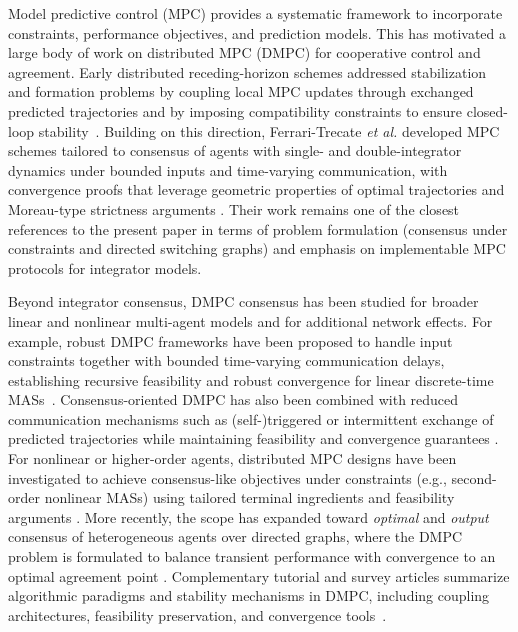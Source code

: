\documentclass[12pt,draftcls,onecolumn]{IEEEtran}
\begin{document}
Model predictive control (MPC) provides a systematic framework to incorporate constraints, performance objectives, and prediction models.
This has motivated a large body of work on distributed MPC (DMPC) for cooperative control and agreement.
Early distributed receding-horizon schemes addressed stabilization and formation problems by coupling local MPC updates through exchanged predicted trajectories and by imposing compatibility constraints to ensure closed-loop stability~\cite{Dunbar.2006,Gruene.2012a}.
Building on this direction, Ferrari-Trecate \emph{et al.} developed MPC schemes tailored to consensus of agents with single- and double-integrator dynamics under bounded inputs and time-varying communication, with convergence proofs that leverage geometric properties of optimal trajectories and Moreau-type strictness arguments \cite{Ferrari-Trecate.2009}.
Their work remains one of the closest references to the present paper in terms of problem formulation (consensus under constraints and directed switching graphs) and emphasis on implementable MPC protocols for integrator models.

Beyond integrator consensus, DMPC consensus has been studied for broader linear and nonlinear multi-agent models and for additional network effects.
For example, robust DMPC frameworks have been proposed to handle input constraints together with bounded time-varying communication delays, establishing recursive feasibility and robust convergence for linear discrete-time MASs~\cite{Wei.2015}.
Consensus-oriented DMPC has also been combined with reduced communication mechanisms such as (self-)triggered or intermittent exchange of predicted trajectories while maintaining feasibility and convergence guarantees \cite{Zhan.2018}.
For nonlinear or higher-order agents, distributed MPC designs have been investigated to achieve consensus-like objectives under constraints (e.g., second-order nonlinear MASs) using tailored terminal ingredients and feasibility arguments \cite{Gao.2017}.
More recently, the scope has expanded toward \emph{optimal} and \emph{output} consensus of heterogeneous agents over directed graphs, where the DMPC problem is formulated to balance transient performance with convergence to an optimal agreement point \cite{Bai.2025}.
Complementary tutorial and survey articles summarize algorithmic paradigms and stability mechanisms in DMPC, including coupling architectures, feasibility preservation, and convergence tools~\cite{Scattolini.2009}.
\end{document}
